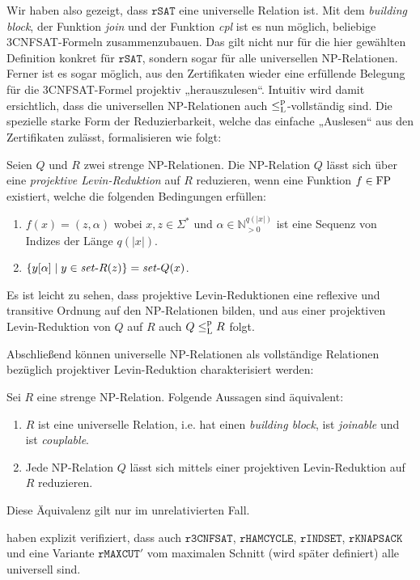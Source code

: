Wir haben also gezeigt, dass $\mathtt{rSAT}$ eine universelle Relation ist.
Mit dem \emph{building block}, der Funktion \emph{join} und der Funktion \emph{cpl} ist es nun möglich, beliebige 3CNFSAT-Formeln zusammenzubauen.
Das gilt nicht nur für die hier gewählten Definition konkret für $\mathtt{rSAT}$, sondern sogar für alle universellen NP-Relationen.
Ferner ist es sogar möglich, aus den Zertifikaten wieder eine erfüllende Belegung für die 3CNFSAT-Formel projektiv „herauszulesen“.
Intuitiv wird damit ersichtlich, dass die universellen NP-Relationen auch $\leq_\mathrm{L}^\mathrm{p}$-vollständig sind.
Die spezielle starke Form der Reduzierbarkeit, welche das einfache „Auslesen“ aus den Zertifikaten zulässt, formalisieren \citeauthor{agrawal_universal_1992} wie folgt:
\begin{definition}\label{def:projective-reduction}
    Seien $Q$ und $R$ zwei strenge NP-Relationen.
    Die NP-Relation $Q$ lässt sich über eine \emph{projektive Levin-Reduktion} auf $R$ reduzieren, wenn eine Funktion $f\in\mathrm{FP}$ existiert, welche die folgenden Bedingungen erfüllen:
    \begin{enumerate}
        \item $f(x)=(z,\alpha)$ wobei $x,z\in\Sigma^*$ und $\alpha\in\mathbb N_{>0}^{q(|x|)}$ ist eine Sequenz von Indizes der Länge $q(|x|)$.
        \item $\{ y[\alpha] \mid y\in \mathit{set}\text{-}{}R(z) \} = \mathit{set}\text{-}{}Q(x)$. \qedhere
    \end{enumerate}
\end{definition}
Es ist leicht zu sehen, dass projektive Levin-Reduktionen eine reflexive und transitive Ordnung auf den NP-Relationen bilden, und aus einer projektiven Levin-Reduktion von $Q$ auf $R$ auch $Q\leq_\mathrm{L}^\mathrm{p} R$ folgt. 

Abschließend können universelle NP-Relationen als vollständige Relationen bezüglich projektiver Levin-Reduktion charakterisiert werden:
\begin{theorem}\label{thm:universal-relations}
    Sei $R$ eine strenge NP-Relation.
    Folgende Aussagen sind äquivalent:
    \begin{enumerate}
        \item $R$ ist eine universelle Relation, i.e.  hat einen \emph{building block}, ist \emph{joinable} und ist \emph{couplable}.
        \item Jede NP-Relation $Q$ lässt sich mittels einer projektiven Levin-Reduktion auf $R$ reduzieren.
    \end{enumerate}
    Diese Äquivalenz gilt nur im unrelativierten Fall.
\end{theorem}
\textcite{agrawal_universal_1992} haben explizit verifiziert, dass auch $\mathtt{r3CNFSAT}$, $\mathtt{rHAMCYCLE}$, $\mathtt{rINDSET}$, $\mathtt{rKNAPSACK}$ und eine Variante $\mathtt{rMAXCUT}'$ vom maximalen Schnitt (wird später definiert) alle universell sind.

